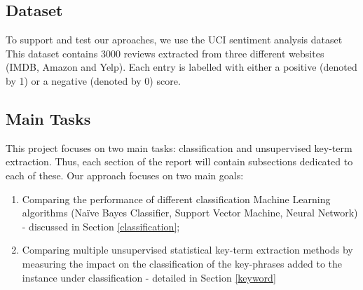 \subsection{Dataset}
To support and test our aproaches, we use the UCI sentiment analysis dataset \cite{ucidata} This dataset contains 3000 reviews extracted from three different websites (IMDB, Amazon and Yelp). Each entry is labelled with either a positive (denoted by 1) or a negative (denoted by 0) score.


\subsection{Main Tasks}
This project focuses on two main tasks: classification and unsupervised key-term extraction. Thus, each section of the report will contain subsections dedicated to each of these.
Our approach focuses on two main goals:
\begin{enumerate}
    \item Comparing the performance of different classification Machine Learning algorithms (Naïve Bayes Classifier, Support Vector Machine, Neural Network) - discussed in Section \ref{classification};
    \item Comparing multiple unsupervised statistical key-term extraction methods by measuring the impact on the classification of the key-phrases added to the instance under classification - detailed in Section \ref{keyword}
\end{enumerate}
